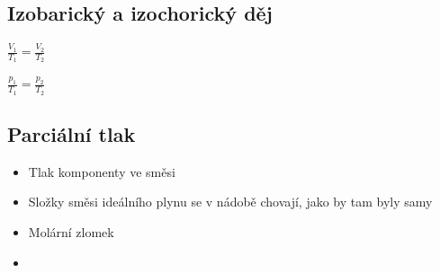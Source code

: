 \subsection{Izobarický a izochorický děj}

$\frac{V_1}{T_1} = \frac{V_2}{T_2}$

$\frac{p_1}{T_1} = \frac{p_2}{T_2}$

\subsection{Parciální tlak}
\begin{itemize}
	\item Tlak komponenty ve směsi
	\item Složky směsi ideálního plynu se v nádobě chovají, jako by tam byly samy
	\item Molární zlomek
	\item {}
\end{itemize}